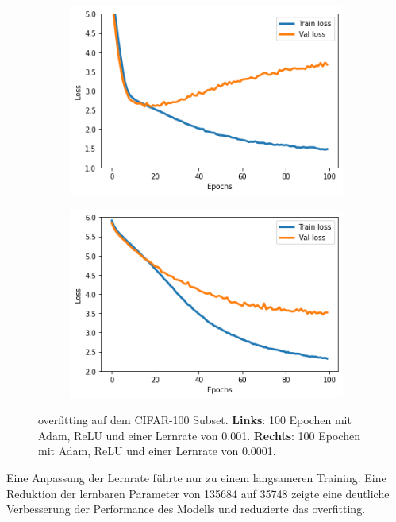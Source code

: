 \begin{figure}[H]
  \centering
  \vspace{1cm}
  \begin{subfigure}
    \centering
    \includegraphics[width=.48\textwidth]{resources/experiments/cifar_100_324_0001.png}
  \end{subfigure}
  \begin{subfigure}
    \centering
    \includegraphics[width=.48\textwidth]{resources/experiments/cifar_100_324_00001.png}
  \end{subfigure}

  \caption{\gls{overfitting} auf dem CIFAR-100 Subset. \textbf{Links}: 100 Epochen mit Adam, ReLU und einer Lernrate von 0.001. \textbf{Rechts}:
    100 Epochen mit Adam, ReLU und einer Lernrate von 0.0001.}
  \label{image:gute-ergebnisse-cifar}
\end{figure}

Eine Anpassung der Lernrate führte nur zu einem langsameren Training. Eine Reduktion der lernbaren Parameter von 135684 auf 35748 zeigte
eine deutliche Verbesserung der Performance des Modells und reduzierte das \gls{overfitting}.

